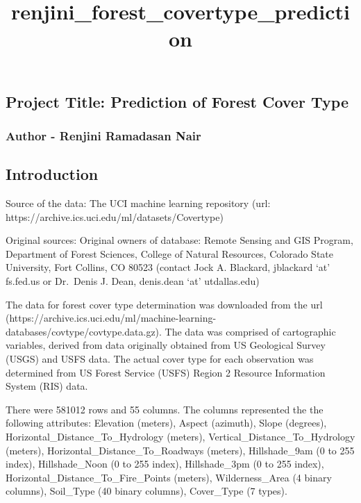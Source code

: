 \documentclass[11pt]{article}
\title{renjini\_forest\_covertype\_prediction}
\begin{document}
    
    
    \maketitle
    
    

    
    \hypertarget{project-title-prediction-of-forest-cover-type}{%
\subsection{Project Title: Prediction of Forest Cover
Type}\label{project-title-prediction-of-forest-cover-type}}

\hypertarget{author---renjini-ramadasan-nair}{%
\subsubsection{Author - Renjini Ramadasan
Nair}\label{author---renjini-ramadasan-nair}}

    \hypertarget{introduction}{%
\subsection{Introduction}\label{introduction}}

Source of the data: The UCI machine learning repository (url:
https://archive.ics.uci.edu/ml/datasets/Covertype)

Original sources: Original owners of database: Remote Sensing and GIS
Program, Department of Forest Sciences, College of Natural Resources,
Colorado State University, Fort Collins, CO 80523 (contact Jock A.
Blackard, jblackard `at' fs.fed.us or Dr.~Denis J. Dean, denis.dean `at'
utdallas.edu)

    The data for forest cover type determination was downloaded from the url
(https://archive.ics.uci.edu/ml/machine-learning-databases/covtype/covtype.data.gz).
The data was comprised of cartographic variables, derived from data
originally obtained from US Geological Survey (USGS) and USFS data. The
actual cover type for each observation was determined from US Forest
Service (USFS) Region 2 Resource Information System (RIS) data.

There were 581012 rows and 55 columns. The columns represented the the
following attributes: Elevation (meters), Aspect (azimuth), Slope
(degrees), Horizontal\_Distance\_To\_Hydrology (meters),
Vertical\_Distance\_To\_Hydrology (meters),
Horizontal\_Distance\_To\_Roadways (meters), Hillshade\_9am (0 to 255
index), Hillshade\_Noon (0 to 255 index), Hillshade\_3pm (0 to 255
index), Horizontal\_Distance\_To\_Fire\_Points (meters),
Wilderness\_Area (4 binary columns), Soil\_Type (40 binary columns),
Cover\_Type (7 types).
\end{document}
